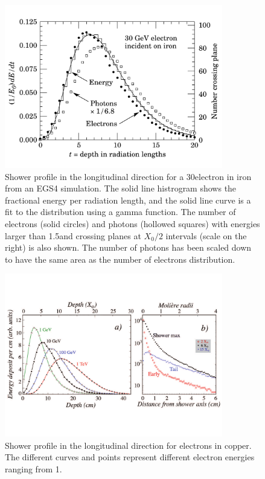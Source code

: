 \begin{figure}[h] \centering
\includegraphics[width=0.85\textwidth]{calorimetry/EGS4_Simulation.pdf}
\caption{Shower profile in the longitudinal direction for
a 30\GeV electron in iron from an EGS4 simulation. The solid line
histrogram shows the fractional energy per radiation length, and the
solid line curve is a fit to the distribution using a gamma
function. The number of electrons (solid circles) and photons
(hollowed squares) with energies larger than 1.5\MeV and crossing
planes at $X_{0}/2$ intervals (scale on the right) is also shown. The
number of photons has been scaled down to have the same area as the
number of electrons distribution.}
\label{fig:showerProfile1}
\end{figure} 
\begin{figure}[h] \centering
\includegraphics[width=0.85\textwidth]{calorimetry/ShowerProfile_Left.pdf}
\caption{Shower profile in the longitudinal direction for
electrons in copper. The different curves and points represent
different electron energies ranging from 1\TeV.}
\label{fig:showerProfile2}
\end{figure} 


